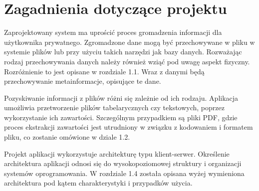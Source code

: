 \documentclass[12pt,a4paper,twoside]{article}
\begin{document}
\section{Zagadnienia dotyczące projektu}
Zaprojektowany system ma uprościć proces gromadzenia informacji dla użytkownika prywatnego. Zgromadzone dane mogą być przechowywane w pliku w systemie plików lub przy użyciu takich narzędzi jak bazy danych. Rozważając rodzaj przechowywania danych należy również wziąć pod uwagę aspekt fizyczny. Rozróżnienie to jest opisane w rozdziale 1.1. Wraz z danymi będą przechowywanie metainformacje, opisujące te dane.  \par
Pozyskiwanie informacji z plików różni się zależnie od ich rodzaju. Aplikacja umożliwia przetworzenie plików tabelarycznych czy tekstowych, poprzez wykorzystanie ich zawartości. Szczególnym przypadkiem są pliki PDF, gdzie proces ekstrakcji zawartości jest utrudniony w związku z kodowaniem i formatem pliku, co zostanie omówione w dziale 1.2. \par
Projekt aplikacji wykorzystuje architekturę typu klient-serwer. Określenie architektura aplikacji odnosi się do wysokopoziomowej struktury i organizacji systemów oprogramowania. W rozdziale 1.4 została opisana wyżej wymieniona architektura pod kątem charakterystyki i przypadków użycia. 
\end{document}
